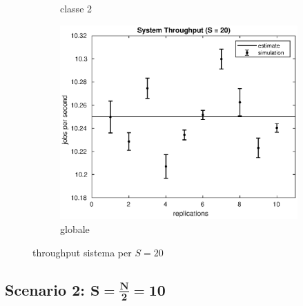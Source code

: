 \begin{figure}[!h]
\begin{subfigure}[t]{0.49\textwidth}
\caption{classe 2}
\label{20_x2}
\end{subfigure}
%
\begin{subfigure}[t]{0.5\textwidth}
\includegraphics[width=\textwidth]{figures/simul/20_500K_x}
\caption{globale}
\label{20_x}
\end{subfigure}
%
\caption{throughput sistema per $S = 20$}
\end{figure}
%

%
%
\subsection{Scenario 2: $\mathbf{S=\frac{N}{2}=10}$}
